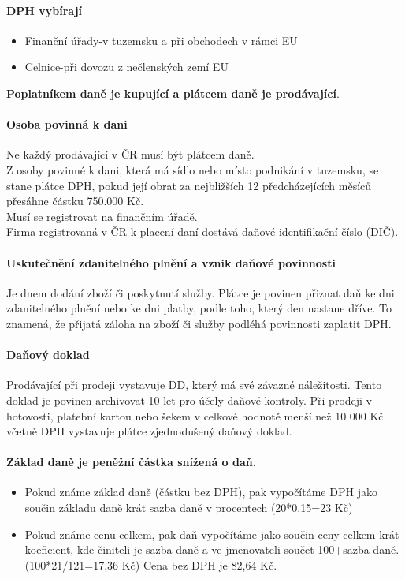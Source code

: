\paragraph{DPH vybírají}
\begin{itemize}
    \item Finanční úřady-v tuzemsku a při obchodech v rámci EU
    \item Celnice-při dovozu z nečlenských zemí EU
\end{itemize}

\textbf{Poplatníkem daně je kupující a plátcem daně je prodávající}.

\paragraph{Osoba povinná k dani}
Ne každý prodávající v ČR musí být plátcem daně. \\
Z osoby povinné k dani, která má sídlo nebo místo podnikání v tuzemsku, se stane plátce DPH, pokud její obrat za nejbližších 12 předcházejících měsíců přesáhne částku 750.000 Kč. \\
Musí se registrovat na finančním úřadě. \\
Firma registrovaná v ČR k placení daní dostává daňové identifikační číslo (DIČ).

\paragraph{Uskutečnění zdanitelného plnění a vznik daňové povinnosti}
Je dnem dodání zboží či poskytnutí služby. Plátce je povinen přiznat daň ke dni zdanitelného plnění nebo ke dni platby, podle toho, který den nastane dříve. To znamená, že přijatá záloha na zboží či služby podléhá povinnosti zaplatit DPH.

\paragraph{Daňový doklad}
Prodávající při prodeji vystavuje DD, který má své závazné náležitosti. Tento doklad je povinen archivovat 10 let pro účely daňové kontroly. Při prodeji v hotovosti, platební kartou nebo šekem v celkové hodnotě menší než 10 000 Kč včetně DPH vystavuje plátce zjednodušený daňový doklad.

\paragraph{Základ daně je peněžní částka snížená o daň.}
\begin{itemize}
    \item Pokud známe základ daně (částku bez DPH), pak vypočítáme DPH jako součin základu daně krát sazba daně v procentech (20*0,15=23 Kč)
    \item Pokud známe cenu celkem, pak daň vypočítáme jako součin ceny celkem krát koeficient, kde činiteli je sazba daně a ve jmenovateli součet 100+sazba daně. (100*21/121=17,36 Kč) Cena bez DPH je 82,64 Kč.
\end{itemize}

